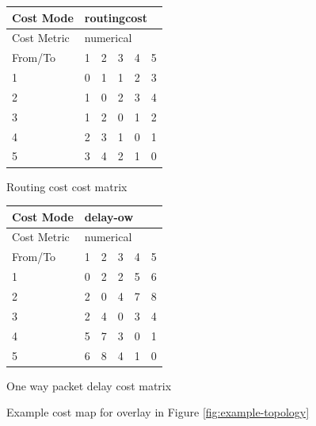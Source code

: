 \begin{figure}[H]
    \centering
    \begin{subtable}{.4\linewidth}
        \centering
        \begin{tabular}{|l|l|l|l|l|l|}
        \hline
        Cost Mode   & \multicolumn{5}{|l|}{routingcost} \\ \hline
        Cost Metric & \multicolumn{5}{|l|}{numerical}   \\ \hline
        From/To     & 1    & 2     & 3   & 4   & 5      \\ \hline
        1           & 0    & 1     & 1   & 2   & 3      \\ \hline
        2           & 1    & 0     & 2   & 3   & 4      \\ \hline
        3           & 1    & 2     & 0   & 1   & 2      \\ \hline
        4           & 2    & 3     & 1   & 0   & 1      \\ \hline
        5           & 3    & 4     & 2   & 1   & 0      \\ \hline
        \end{tabular}
    \caption{Routing cost cost matrix}
    \end{subtable}
    \begin{subtable}{.4\linewidth}
        \centering
        \begin{tabular}{|l|l|l|l|l|l|}
        \hline
        Cost Mode   & \multicolumn{5}{|l|}{delay-ow}    \\ \hline
        Cost Metric & \multicolumn{5}{|l|}{numerical}   \\ \hline
        From/To     & 1    & 2     & 3   & 4   & 5      \\ \hline
        1           & 0    & 2     & 2   & 5   & 6      \\ \hline
        2           & 2    & 0     & 4   & 7   & 8      \\ \hline
        3           & 2    & 4     & 0   & 3   & 4      \\ \hline
        4           & 5    & 7     & 3   & 0   & 1      \\ \hline
        5           & 6    & 8     & 4   & 1   & 0      \\ \hline
        \end{tabular}
    \caption{One way packet delay cost matrix}
    \end{subtable}

    \caption{Example cost map for overlay in Figure \ref{fig:example-topology}}
    \label{table:costmap-example-non-boundary}
\end{figure}

